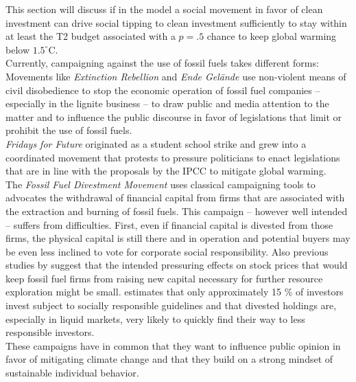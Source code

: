 This section will discuss if in the model a social movement in favor of clean investment can drive social tipping to clean investment sufficiently to stay within at least the T2 budget associated with a $p=.5$ chance to keep global warming below $1.5^{\circ}$C.\\

Currently, campaigning against the use of fossil fuels takes different forms: \\

Movements like \textit{Extinction Rebellion} and \textit{Ende Gel\"{a}nde} use non-violent means of civil disobedience to stop the economic operation of fossil fuel companies -- especially in the lignite business -- to draw public and media attention to the matter and to influence the public discourse in favor of legislations that limit or prohibit the use of fossil fuels.\\

\textit{Fridays for Future} originated as a student school strike and grew into a coordinated movement that protests to pressure politicians to enact legislations that are in line with the proposals by the IPCC to mitigate global warming.\\

The \textit{Fossil Fuel Divestment Movement} uses classical campaigning tools to advocates the withdrawal of financial capital from firms that are associated with the extraction and burning of fossil fuels. This campaign -- however well intended -- suffers from difficulties. First, even if financial capital is divested from those firms, the physical capital is still there and in operation and potential buyers may be even less inclined to vote for corporate social responsibility. Also previous studies by \cite{Ans2013} suggest that the intended pressuring effects on stock prices that would keep fossil fuel firms from raising new capital necessary for further resource exploration might be small. \cite{SIF2014Report} estimates that only approximately 15 \% of investors invest subject to socially responsible guidelines and that divested holdings are, especially in liquid markets, very likely to quickly find their way to less responsible investors.\\

These campaigns have in common that they want to influence public opinion in favor of mitigating climate change and that they build on a strong mindset of sustainable individual behavior.\\

